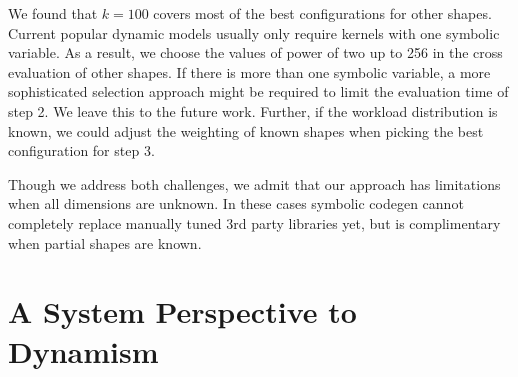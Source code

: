 We found that $k=100$ covers most of the best configurations for other shapes. Current popular dynamic models usually only require kernels with one symbolic variable. As a result, we choose the values of power of two up to 256 in the cross evaluation of other shapes. If there is more than one symbolic variable, a more sophisticated selection approach might be required to limit the evaluation time of step 2. We leave this to the future work. Further, if the workload distribution is known, we could adjust the weighting of known shapes when picking the best configuration for step 3.

Though we address both challenges, we admit that our approach has limitations when all dimensions are unknown. In these cases symbolic codegen cannot completely replace manually tuned 3rd party libraries yet, but is complimentary when partial shapes are known.





\section{A System Perspective to Dynamism}
\label{sec:Relay-background}

